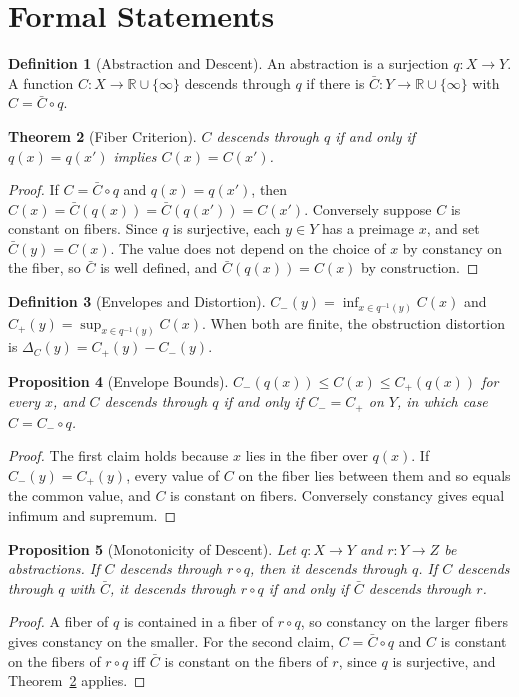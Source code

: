 \documentclass[11pt,letterpaper]{report}
\theoremstyle{plain}
\newtheorem{theorem}{Theorem}[chapter]
\newtheorem{proposition}[theorem]{Proposition}
\theoremstyle{definition}
\newtheorem{definition}[theorem]{Definition}
\theoremstyle{remark}
\begin{document}
\section{Formal Statements}

\begin{definition}[Abstraction and Descent]\label{def:descent}
An abstraction is a surjection $q:X\to Y$. A function $C:X\to\mathbb R\cup\{\infty\}$ descends through $q$ if there is $\bar C:Y\to\mathbb R\cup\{\infty\}$ with $C=\bar C\circ q$.
\end{definition}

\begin{theorem}[Fiber Criterion]\label{th:fiber}
$C$ descends through $q$ if and only if $q(x)=q(x')$ implies $C(x)=C(x')$.
\end{theorem}
\begin{proof}
If $C=\bar C\circ q$ and $q(x)=q(x')$, then $C(x)=\bar C(q(x))=\bar C(q(x'))=C(x')$. Conversely suppose $C$ is constant on fibers. Since $q$ is surjective, each $y\in Y$ has a preimage $x$, and set $\bar C(y)=C(x)$. The value does not depend on the choice of $x$ by constancy on the fiber, so $\bar C$ is well defined, and $\bar C(q(x))=C(x)$ by construction.
\end{proof}

\begin{definition}[Envelopes and Distortion]\label{def:envelopes}
$C_-(y)=\inf_{x\in q^{-1}(y)}C(x)$ and $C_+(y)=\sup_{x\in q^{-1}(y)}C(x)$. When both are finite, the obstruction distortion is $\Delta_C(y)=C_+(y)-C_-(y)$.
\end{definition}

\begin{proposition}[Envelope Bounds]\label{pr:envelope}
$C_-(q(x))\le C(x)\le C_+(q(x))$ for every $x$, and $C$ descends through $q$ if and only if $C_-=C_+$ on $Y$, in which case $C=C_-\circ q$.
\end{proposition}
\begin{proof}
The first claim holds because $x$ lies in the fiber over $q(x)$. If $C_-(y)=C_+(y)$, every value of $C$ on the fiber lies between them and so equals the common value, and $C$ is constant on fibers. Conversely constancy gives equal infimum and supremum.
\end{proof}

\begin{proposition}[Monotonicity of Descent]\label{pr:descentmono}
Let $q:X\to Y$ and $r:Y\to Z$ be abstractions. If $C$ descends through $r\circ q$, then it descends through $q$. If $C$ descends through $q$ with $\bar C$, it descends through $r\circ q$ if and only if $\bar C$ descends through $r$.
\end{proposition}
\begin{proof}
A fiber of $q$ is contained in a fiber of $r\circ q$, so constancy on the larger fibers gives constancy on the smaller. For the second claim, $C=\bar C\circ q$ and $C$ is constant on the fibers of $r\circ q$ iff $\bar C$ is constant on the fibers of $r$, since $q$ is surjective, and Theorem~\ref{th:fiber} applies.
\end{proof}
\end{document}

